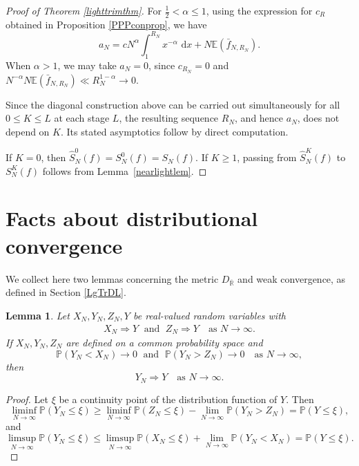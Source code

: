 \documentclass[11pt,twoside,a4paper,reqno]{amsart}
\newtheorem{lemma}[theorem]{Lemma}
\newcommand{\as}[1]{\text{as } #1 \rightarrow\infty}
\renewcommand{\d}{\, \text{d}}
\renewcommand{\P}{\mathbb{P}}
\newcommand{\E}{\mathbb{E}}
\begin{document}
\begin{proof}[Proof of Theorem \ref{lighttrimthm}]
For $\frac{1}{2}<\alpha\leq 1$, using the expression for $c_R$ obtained in Proposition \ref{PPPconprop}, we have
$$
a_N=cN^\alpha\int_1^{R_N}x^{-\alpha}\,\d x+N\E(\bar f_{N,R_N}).
$$
When $\alpha>1$, we may take $a_N=0$, since $c_{R_N}=0$ and
$N^{-\alpha}N\E(\bar f_{N,R_N})\ll R_N^{1-\alpha}\to0.$

Since the diagonal construction above can be carried out simultaneously for all $0\le K\le L$ at each stage $L$, the resulting sequence $R_N$, and hence $a_N$, does not depend on $K$. Its stated asymptotics follow by direct computation.



If $K=0$, then $\hat S_N^0(f)=S_N^0(f)=S_N(f).$ If $K\ge1$, passing from $\hat{S}_N^K(f)$ to $S_N^K(f)$ follows from Lemma~\ref{nearlightlem}.



\end{proof}



\section{Facts about distributional convergence}\label{metricsec}
We collect here two lemmas concerning the metric $D_{\overline{\mathbb R}}$ and weak convergence, as defined in Section \ref{LgTrDL}.



\begin{lemma}\label{sandwichlem}
Let $X_N,Y_N,Z_N,Y$ be real-valued random variables with
\begin{align*}
X_N \Rightarrow Y \; \text{ and } \; Z_N\Rightarrow Y \quad \as{N}.
\end{align*}
If $X_N,Y_N,Z_N$ are defined on a common probability space and
\begin{equation}\label{squeezeasm}
\P( Y_N < X_N) \rightarrow 0 \; \text{ and }\; \P(Y_N > Z_N) \rightarrow 0 \quad \as{N},
\end{equation}
then
\begin{equation*}
Y_N\Rightarrow Y \quad \as{N}.
\end{equation*}
\end{lemma}
\begin{proof}
Let $\xi$ be a continuity point of the distribution function of $Y.$ Then
\begin{equation*}
\liminf_{N\to \infty} \P(Y_N \leq \xi) \geq \liminf_{N\to \infty}\P(Z_N \leq \xi) -\lim_{N\to \infty} \P(Y_N > Z_N) =\P(Y\leq \xi),
\end{equation*}
and
\begin{equation*}
\limsup_{N\to \infty} \P(Y_N \leq \xi) \leq \limsup_{N\to \infty} \P(X_N \leq \xi) + \lim_{N\to \infty}\P( Y_N < X_N)=\P(Y\leq \xi).
\end{equation*}
\end{proof}
\end{document}
